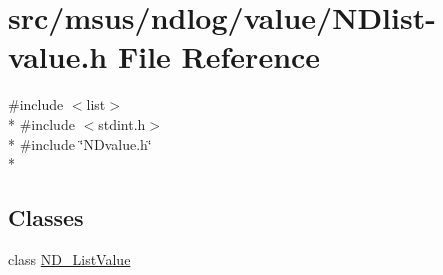 \hypertarget{_n_dlist-value_8h}{\section{src/msus/ndlog/value/\-N\-Dlist-\/value.h File Reference}
\label{_n_dlist-value_8h}
}
{\ttfamily \#include $<$list$>$}\\*
{\ttfamily \#include $<$stdint.\-h$>$}\\*
{\ttfamily \#include \char`\"{}N\-Dvalue.\-h\char`\"{}}\\*
\subsection*{Classes}
\begin{DoxyCompactItemize}
\item 
class \hyperlink{class_n_d___list_value}{N\-D\-\_\-\-List\-Value}
\end{DoxyCompactItemize}
